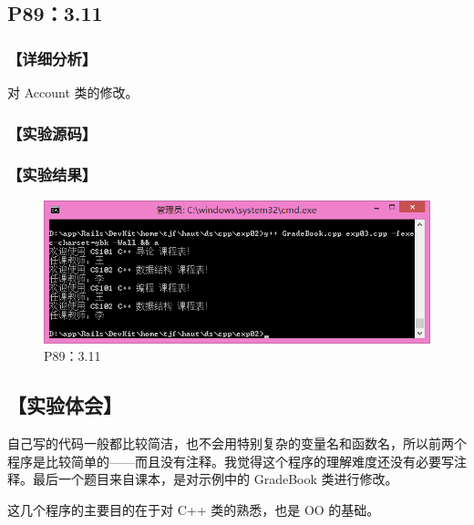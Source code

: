 \subsection{P89：3.11}
\subsubsection*{【详细分析】}
对 Account 类的修改。
\subsubsection*{【实验源码】}
{\linespread{1}}
{\linespread{1}}
{\linespread{1}}
\subsubsection*{【实验结果】}
\begin{figure}[htp]
\centering
\includegraphics[width=\textwidth]{exp02/exp03.png}
\caption{\label{out02_03}P89：3.11}
\end{figure}

\subsection*{【实验体会】}
自己写的代码一般都比较简洁，也不会用特别复杂的变量名和函数名，所以前两个程序是比较简单的——而且没有注释。我觉得这个程序的理解难度还没有必要写注释。最后一个题目来自课本，是对示例中的 GradeBook 类进行修改。

这几个程序的主要目的在于对 C++ 类的熟悉，也是 OO 的基础。